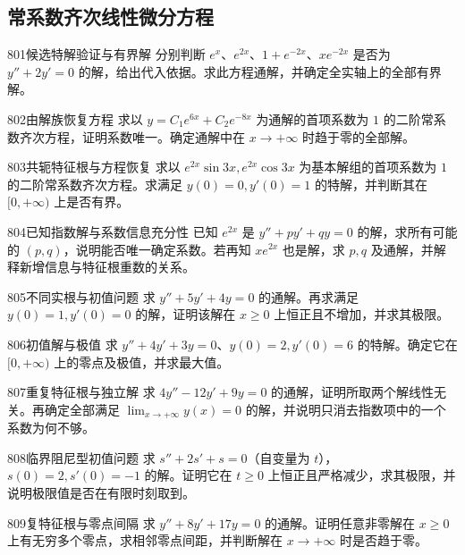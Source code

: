 \subsection{常系数齐次线性微分方程}
\begin{exercise}{801}{候选特解验证与有界解}
分别判断 $e^x$、$e^{2x}$、$1+e^{-2x}$、$xe^{-2x}$ 是否为 $y''+2y'=0$ 的解，给出代入依据。求此方程通解，并确定全实轴上的全部有界解。
\end{exercise}
\begin{exercise}{802}{由解族恢复方程}
求以 $y=C_1e^{6x}+C_2e^{-8x}$ 为通解的首项系数为 $1$ 的二阶常系数齐次方程，证明系数唯一。确定通解中在 $x\to+\infty$ 时趋于零的全部解。
\end{exercise}
\begin{exercise}{803}{共轭特征根与方程恢复}
求以 $e^{2x}\sin3x,e^{2x}\cos3x$ 为基本解组的首项系数为 $1$ 的二阶常系数齐次方程。求满足 $y(0)=0,y'(0)=1$ 的特解，并判断其在 $[0,+\infty)$ 上是否有界。
\end{exercise}
\begin{exercise}{804}{已知指数解与系数信息充分性}
已知 $e^{2x}$ 是 $y''+py'+qy=0$ 的解，求所有可能的 $(p,q)$，说明能否唯一确定系数。若再知 $xe^{2x}$ 也是解，求 $p,q$ 及通解，并解释新增信息与特征根重数的关系。
\end{exercise}
\begin{exercise}{805}{不同实根与初值问题}
求 $y''+5y'+4y=0$ 的通解。再求满足 $y(0)=1,y'(0)=0$ 的解，证明该解在 $x\ge0$ 上恒正且不增加，并求其极限。
\end{exercise}
\begin{exercise}{806}{初值解与极值}
求 $y''+4y'+3y=0$、$y(0)=2,y'(0)=6$ 的特解。确定它在 $[0,+\infty)$ 上的零点及极值，并求最大值。
\end{exercise}
\begin{exercise}{807}{重复特征根与独立解}
求 $4y''-12y'+9y=0$ 的通解，证明所取两个解线性无关。再确定全部满足 $\lim_{x\to+\infty}y(x)=0$ 的解，并说明只消去指数项中的一个系数为何不够。
\end{exercise}
\begin{exercise}{808}{临界阻尼型初值问题}
求 $s''+2s'+s=0$（自变量为 $t$），$s(0)=2,s'(0)=-1$ 的解。证明它在 $t\ge0$ 上恒正且严格减少，求其极限，并说明极限值是否在有限时刻取到。
\end{exercise}
\begin{exercise}{809}{复特征根与零点间隔}
求 $y''+8y'+17y=0$ 的通解。证明任意非零解在 $x\ge0$ 上有无穷多个零点，求相邻零点间距，并判断解在 $x\to+\infty$ 时是否趋于零。
\end{exercise}
